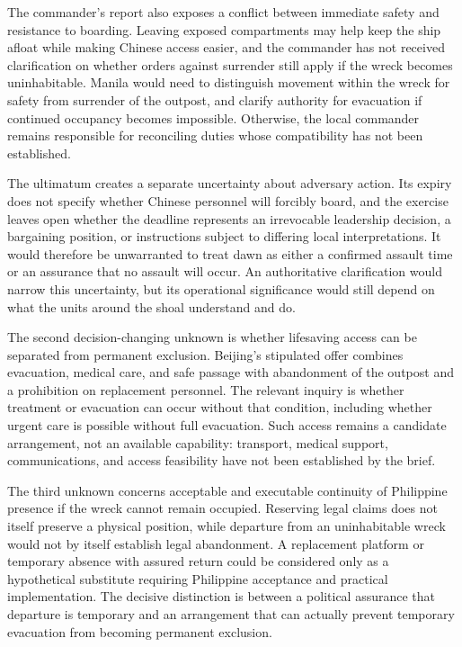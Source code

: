 \documentclass[11pt]{article}
\begin{document}
The commander’s report also exposes a conflict between immediate safety and resistance to boarding. Leaving exposed compartments may help keep the ship afloat while making Chinese access easier, and the commander has not received clarification on whether orders against surrender still apply if the wreck becomes uninhabitable. Manila would need to distinguish movement within the wreck for safety from surrender of the outpost, and clarify authority for evacuation if continued occupancy becomes impossible. Otherwise, the local commander remains responsible for reconciling duties whose compatibility has not been established.

The ultimatum creates a separate uncertainty about adversary action. Its expiry does not specify whether Chinese personnel will forcibly board, and the exercise leaves open whether the deadline represents an irrevocable leadership decision, a bargaining position, or instructions subject to differing local interpretations. It would therefore be unwarranted to treat dawn as either a confirmed assault time or an assurance that no assault will occur. An authoritative clarification would narrow this uncertainty, but its operational significance would still depend on what the units around the shoal understand and do.

The second decision-changing unknown is whether lifesaving access can be separated from permanent exclusion. Beijing’s stipulated offer combines evacuation, medical care, and safe passage with abandonment of the outpost and a prohibition on replacement personnel. The relevant inquiry is whether treatment or evacuation can occur without that condition, including whether urgent care is possible without full evacuation. Such access remains a candidate arrangement, not an available capability: transport, medical support, communications, and access feasibility have not been established by the brief.

The third unknown concerns acceptable and executable continuity of Philippine presence if the wreck cannot remain occupied. Reserving legal claims does not itself preserve a physical position, while departure from an uninhabitable wreck would not by itself establish legal abandonment. A replacement platform or temporary absence with assured return could be considered only as a hypothetical substitute requiring Philippine acceptance and practical implementation. The decisive distinction is between a political assurance that departure is temporary and an arrangement that can actually prevent temporary evacuation from becoming permanent exclusion.
\end{document}
